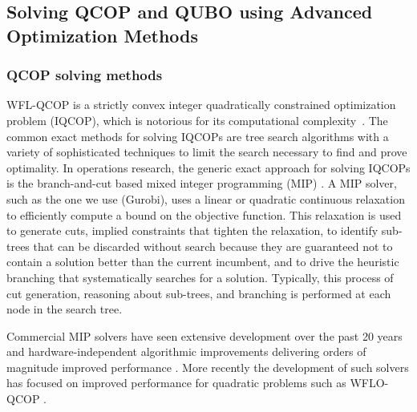\documentclass[preprint,12pt]{elsarticle}
\begin{document}
\subsection{Solving QCOP and QUBO using Advanced Optimization Methods}

\subsubsection{QCOP solving methods}

WFL-QCOP is a strictly convex integer 
quadratically constrained optimization problem (IQCOP), which is notorious for its computational complexity~\cite{van1981another}.
The common exact methods for solving
IQCOPs are tree search \cite{land2010automatic} algorithms with a variety of sophisticated techniques to limit the search necessary to find and prove optimality.  In operations research, the generic exact approach for solving IQCOPs is the branch-and-cut based mixed integer programming (MIP) \cite{bonami2008algorithmic}. A MIP solver, such as the one we use (Gurobi), uses a linear or quadratic continuous relaxation to efficiently compute a bound on the objective function. This relaxation is used to generate cuts, implied constraints that tighten the relaxation, to identify sub-trees that can be discarded without search because they are guaranteed not to contain a solution better than the current incumbent, and to drive the heuristic branching that systematically searches for a solution. Typically, this process of cut generation, reasoning about sub-trees, and branching is performed at each node in the search tree.

Commercial MIP solvers have seen extensive development over the past 20 years and hardware-independent algorithmic improvements delivering orders of magnitude improved performance \cite{Bixby07a}. More recently the development of such solvers has focused on improved performance for quadratic problems such as WFLO-QCOP \cite{Furini19a}.

\end{document}
